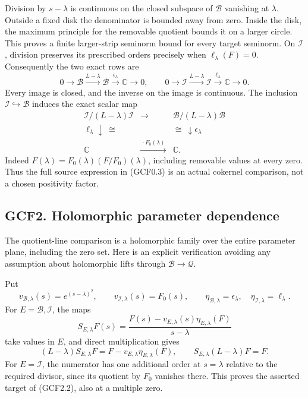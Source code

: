 Division by \(s-\lambda\) is continuous on the closed subspace of
\(\mathcal B\) vanishing at \(\lambda\). Outside a fixed disk the
denominator is bounded away from zero. Inside the disk, the maximum
principle for the removable quotient bounds it on a larger circle. This
proves a finite larger-strip seminorm bound for every target seminorm.
On \(\mathcal I\), division preserves its prescribed orders precisely
when \(\ell_\lambda(F)=0\). Consequently the two exact rows are \[
0\to\mathcal B\xrightarrow{L-\lambda}\mathcal B
\xrightarrow{\epsilon_\lambda}\mathbb C\to0,
\qquad
0\to\mathcal I\xrightarrow{L-\lambda}\mathcal I
\xrightarrow{\ell_\lambda}\mathbb C\to0.
\tag{GCF1.2}
\] Every image is closed, and the inverse on the image is continuous.
The inclusion \(\mathcal I\hookrightarrow\mathcal B\) induces the exact
scalar map \[
\begin{array}{ccc}
\mathcal I/(L-\lambda)\mathcal I&\longrightarrow&
\mathcal B/(L-\lambda)\mathcal B\\
\ell_\lambda\downarrow\ \cong&&\cong\ \downarrow\epsilon_\lambda\\
\mathbb C&\xrightarrow{\ \cdot F_0(\lambda)\ }&\mathbb C.
\end{array}
\tag{GCF1.3}
\] Indeed \(F(\lambda)=F_0(\lambda)(F/F_0)(\lambda)\), including
removable values at every zero. Thus the full source expression in
(GCF0.3) is an actual cokernel comparison, not a chosen positivity
factor.

\subsection{GCF2. Holomorphic parameter
dependence}\label{gcf2.-holomorphic-parameter-dependence}

The quotient-line comparison is a holomorphic family over the entire
parameter plane, including the zero set. Here is an explicit
verification avoiding any assumption about holomorphic lifts through
\(\mathcal B\to\mathcal Q\).

Put \[
v_{\mathcal B,\lambda}(s)=e^{(s-\lambda)^2},\qquad
v_{\mathcal I,\lambda}(s)=F_0(s),\qquad
\eta_{\mathcal B,\lambda}=\epsilon_\lambda,\quad
\eta_{\mathcal I,\lambda}=\ell_\lambda.
\tag{GCF2.1}
\] For \(E=\mathcal B,\mathcal I\), the maps \[
S_{E,\lambda}F(s)=
\frac{F(s)-v_{E,\lambda}(s)\eta_{E,\lambda}(F)}{s-\lambda}
\tag{GCF2.2}
\] take values in \(E\), and direct multiplication gives \[
(L-\lambda)S_{E,\lambda}F
=F-v_{E,\lambda}\eta_{E,\lambda}(F),
\qquad S_{E,\lambda}(L-\lambda)F=F.
\tag{GCF2.3}
\] For \(E=\mathcal I\), the numerator has one additional order at
\(s=\lambda\) relative to the required divisor, since its quotient by
\(F_0\) vanishes there. This proves the asserted target of (GCF2.2),
also at a multiple zero.

